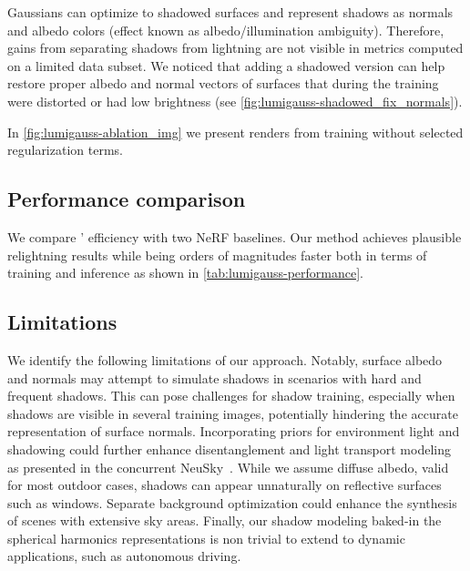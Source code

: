     Gaussians can optimize to shadowed surfaces and represent shadows as normals
    and albedo colors (effect known as albedo/illumination ambiguity).
    Therefore, gains from separating shadows from lightning are not visible in
    metrics computed on a limited data subset.
    We noticed that adding a shadowed version can help restore proper albedo and
    normal vectors of surfaces that during the training were distorted or had low
    brightness (see \cref{fig:lumigauss-shadowed_fix_normals}).

    
    
    
    In \cref{fig:lumigauss-ablation_img} we present renders from training without
    selected regularization terms.

  \subsection{Performance comparison}
    We compare \lumigauss' efficiency with two NeRF baselines.
    Our method achieves plausible relightning results while being orders of
    magnitudes faster both in terms of training and inference as shown in
    \cref{tab:lumigauss-performance}.
  \subsection{Limitations}
    We identify the following limitations of our approach.
    Notably, surface albedo and normals may attempt to simulate shadows in
    scenarios with hard and frequent shadows.
    This can pose challenges for shadow training, especially when shadows are
    visible in several training images, potentially hindering the accurate
    representation of surface normals.
    Incorporating priors for environment light and shadowing could further enhance
    disentanglement and light transport modeling as presented in the concurrent
    NeuSky~\cite{gardner2023neusky}.
    While we assume diffuse albedo, valid for most outdoor cases, shadows can
    appear unnaturally on reflective surfaces such as windows.
    Separate background optimization could enhance the synthesis of scenes with
    extensive sky areas.
    Finally, our shadow modeling baked-in the spherical harmonics representations
    is non trivial to extend to dynamic applications, such as autonomous driving.
